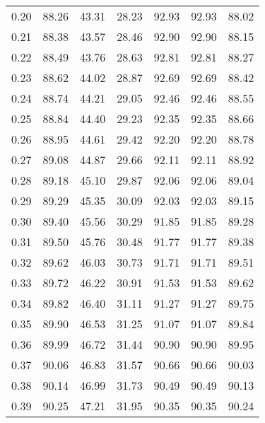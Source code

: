 \begin{tabular}{|c|c|c|c|c|c|c|}
      0.20 &     88.26 &     43.31 &      28.23 &   92.93 &      92.93 &         88.02 \\
      0.21 &     88.38 &     43.57 &      28.46 &   92.90 &      92.90 &         88.15 \\
      0.22 &     88.49 &     43.76 &      28.63 &   92.81 &      92.81 &         88.27 \\
      0.23 &     88.62 &     44.02 &      28.87 &   92.69 &      92.69 &         88.42 \\
      0.24 &     88.74 &     44.21 &      29.05 &   92.46 &      92.46 &         88.55 \\
      0.25 &     88.84 &     44.40 &      29.23 &   92.35 &      92.35 &         88.66 \\
      0.26 &     88.95 &     44.61 &      29.42 &   92.20 &      92.20 &         88.78 \\
      0.27 &     89.08 &     44.87 &      29.66 &   92.11 &      92.11 &         88.92 \\
      0.28 &     89.18 &     45.10 &      29.87 &   92.06 &      92.06 &         89.04 \\
      0.29 &     89.29 &     45.35 &      30.09 &   92.03 &      92.03 &         89.15 \\
      0.30 &     89.40 &     45.56 &      30.29 &   91.85 &      91.85 &         89.28 \\
      0.31 &     89.50 &     45.76 &      30.48 &   91.77 &      91.77 &         89.38 \\
      0.32 &     89.62 &     46.03 &      30.73 &   91.71 &      91.71 &         89.51 \\
      0.33 &     89.72 &     46.22 &      30.91 &   91.53 &      91.53 &         89.62 \\
      0.34 &     89.82 &     46.40 &      31.11 &   91.27 &      91.27 &         89.75 \\
      0.35 &     89.90 &     46.53 &      31.25 &   91.07 &      91.07 &         89.84 \\
      0.36 &     89.99 &     46.72 &      31.44 &   90.90 &      90.90 &         89.95 \\
      0.37 &     90.06 &     46.83 &      31.57 &   90.66 &      90.66 &         90.03 \\
      0.38 &     90.14 &     46.99 &      31.73 &   90.49 &      90.49 &         90.13 \\
      0.39 &     90.25 &     47.21 &      31.95 &   90.35 &      90.35 &         90.24 \\

\end{tabular}
